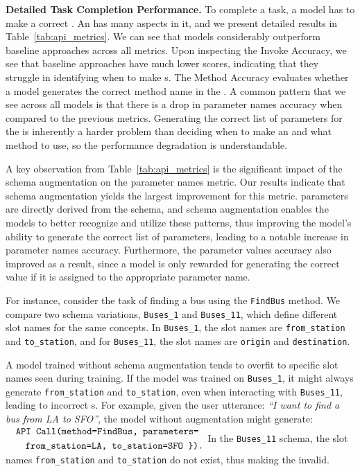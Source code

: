 

\noindent
\textbf{Detailed Task Completion Performance.}
To complete a task, a model has to make a correct {\apicall}. An {\apicall} has many aspects in it, and we present detailed results in Table~\ref{tab:api_metrics}. We can see that {\oursys} models considerably outperform baseline approaches across all metrics. Upon inspecting the {\apicall} Invoke Accuracy, we see that baseline approaches have much lower scores, indicating that they struggle in identifying when to make {\apicall}s. The {\apicall} Method Accuracy evaluates whether a model generates the correct method name in the \apicall. A common pattern that we see across all models is that there is a drop in parameter names accuracy when compared to the previous metrics. Generating the correct list of parameters for the {\apicall} is inherently a harder problem than deciding when to make an {\apicall} and what method to use, so the performance degradation is understandable. 

A key observation from Table~\ref{tab:api_metrics} is the significant impact of the schema augmentation on the {\apicall} parameter names metric. Our results indicate that schema augmentation yields the largest improvement for this metric. {\apicall} parameters are directly derived from the schema, and schema augmentation enables the models to better recognize and utilize these patterns, thus improving the model's ability to generate the correct list of parameters, leading to a notable increase in parameter names accuracy. Furthermore, the {\apicall} parameter values accuracy also improved as a result, since a model is only rewarded for generating the correct value if it is assigned to the appropriate parameter name. 

For instance, consider the task of finding a bus using the \texttt{FindBus} method. We compare two schema variations, \texttt{Buses\_1} and \texttt{Buses\_11}, which define different slot names for the same concepts. In \texttt{Buses\_1}, the slot names are \texttt{from\_station} and \texttt{to\_station}, and for \texttt{Buses\_11}, the slot names are \texttt{origin} and \texttt{destination}.

A model trained without schema augmentation tends to overfit to specific slot names seen during training. If the model was trained on \texttt{Buses\_1}, it might always generate \texttt{from\_station} and \texttt{to\_station}, even when interacting with \texttt{Buses\_11}, leading to incorrect {\apicall}s.
For example, given the user utterance: \textit{``I want to find a bus from LA to SFO''}, the model without augmentation might generate: 
\(
\begin{aligned}
    &\quad\texttt{API Call(method=FindBus, parameters=} \\
    &\quad \quad \texttt{from\_station=LA, to\_station=SFO \}).}
\end{aligned}
\)
In the \texttt{Buses\_11} schema, the slot names \texttt{from\_station} and \texttt{to\_station} do not exist, thus making the {\apicall} invalid.

